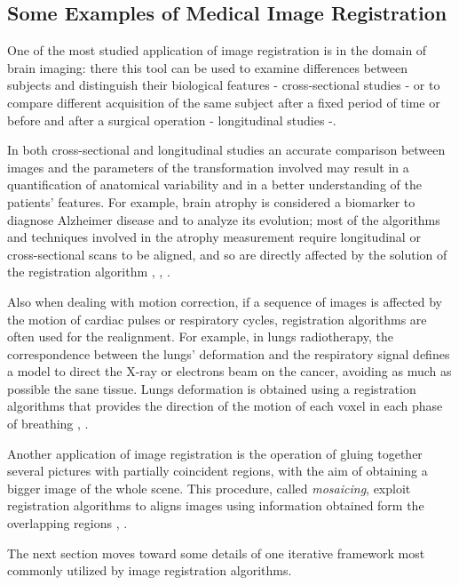 \subsection{Some Examples of Medical Image Registration}
One of the most studied application of image registration is in the domain of brain imaging: there this tool can be used to examine differences between subjects and distinguish their biological features - cross-sectional studies - or to compare different acquisition of the same subject after a fixed period of time or before and after a surgical operation - longitudinal studies -. 

In both cross-sectional and longitudinal studies an accurate comparison between images and the parameters of the transformation involved may result in a quantification of anatomical variability and in a better understanding of the patients' features. 
%
For example, brain atrophy is considered a biomarker to diagnose Alzheimer disease and to analyze its evolution; most of the algorithms and techniques involved in the atrophy measurement require longitudinal or cross-sectional scans to be aligned, and so are directly affected by the solution of the registration algorithm \cite{prados2015measuring}, \cite{fox1997brain}, \cite{gauthier2012prevention}. 

Also when dealing with motion correction, if a sequence of images is affected by the motion of cardiac pulses or respiratory cycles, registration algorithms are often used for the realignment. 
For example, in lungs radiotherapy, the correspondence between the lungs' deformation and the respiratory signal defines a model to direct the X-ray or electrons beam on the cancer, avoiding as much as possible the sane tissue. Lungs deformation is obtained using a registration algorithms that provides the direction of the motion of each voxel in each phase of breathing \cite{mcclelland}, \cite{mcclelland2011inter}.

Another application of image registration is the operation of gluing together several pictures with partially coincident regions, with the aim of obtaining a bigger image of the whole scene. This procedure, called \emph{mosaicing}, exploit registration algorithms to aligns images using information obtained form the overlapping regions \cite{vercauteren2006robust}, \cite{szeliski1994image}.

The next section moves toward some details of one iterative framework most commonly utilized by image registration algorithms.


